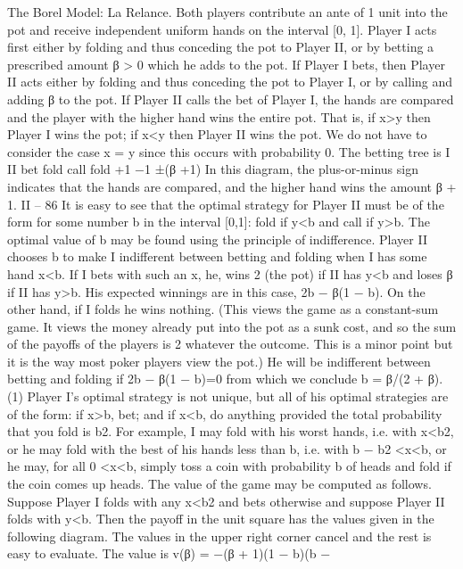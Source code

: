 The Borel Model: La Relance. Both players contribute an ante of 1 unit into the
pot and receive independent uniform hands on the interval [0, 1]. Player I acts first either
by folding and thus conceding the pot to Player II, or by betting a prescribed amount
β > 0 which he adds to the pot. If Player I bets, then Player II acts either by folding and
thus conceding the pot to Player I, or by calling and adding β to the pot. If Player II calls
the bet of Player I, the hands are compared and the player with the higher hand wins the
entire pot. That is, if x>y then Player I wins the pot; if x<y then Player II wins the
pot. We do not have to consider the case x = y since this occurs with probability 0.
The betting tree is
I
II
bet fold
call fold
+1
−1
±(β +1)
In this diagram, the plus-or-minus sign indicates that the hands are compared, and
the higher hand wins the amount β + 1.
II – 86
It is easy to see that the optimal strategy for Player II must be of the form for some
number b in the interval [0,1]: fold if y<b and call if y>b. The optimal value of b may be
found using the principle of indifference. Player II chooses b to make I indifferent between
betting and folding when I has some hand x<b. If I bets with such an x, he, wins 2 (the
pot) if II has y<b and loses β if II has y>b. His expected winnings are in this case,
2b − β(1 − b). On the other hand, if I folds he wins nothing. (This views the game as a
constant-sum game. It views the money already put into the pot as a sunk cost, and so
the sum of the payoffs of the players is 2 whatever the outcome. This is a minor point but
it is the way most poker players view the pot.) He will be indifferent between betting and
folding if
2b − β(1 − b)=0
from which we conclude
b = β/(2 + β). (1)
Player I’s optimal strategy is not unique, but all of his optimal strategies are of the
form: if x>b, bet; and if x<b, do anything provided the total probability that you fold
is b2. For example, I may fold with his worst hands, i.e. with x<b2, or he may fold with
the best of his hands less than b, i.e. with b − b2 <x<b, or he may, for all 0 <x<b,
simply toss a coin with probability b of heads and fold if the coin comes up heads.
The value of the game may be computed as follows. Suppose Player I folds with any
x<b2 and bets otherwise and suppose Player II folds with y<b. Then the payoff in the
unit square has the values given in the following diagram. The values in the upper right
corner cancel and the rest is easy to evaluate. The value is v(β) = −(β + 1)(1 − b)(b −
